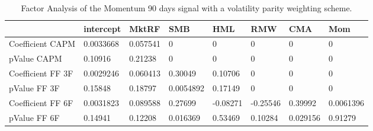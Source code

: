 \begin{table}[H]
\centering
\begin{tabular}{llllllll}
& intercept & MktRF & SMB & HML & RMW & CMA & Mom \\ 
\hline 
Coefficient CAPM & 0.0033668 & 0.057541 & 0 & 0 & 0 & 0 & 0 \\ 
pValue CAPM & 0.10916 & 0.21238 & 0 & 0 & 0 & 0 & 0 \\ 
Coefficient FF 3F & 0.0029246 & 0.060413 & 0.30049 & 0.10706 & 0 & 0 & 0 \\ 
pValue FF 3F & 0.15848 & 0.18797 & 0.0054892 & 0.17149 & 0 & 0 & 0 \\ 
Coefficient FF 6F & 0.0031823 & 0.089588 & 0.27699 & -0.08271 & -0.25546 & 0.39992 & 0.0061396 \\ 
pValue FF 6F & 0.14941 & 0.12208 & 0.016369 & 0.53469 & 0.10284 & 0.029156 & 0.91279 \\ 
\hline
\end{tabular}
\caption{Factor Analysis of the Momentum 90 days signal with a volatility parity weighting scheme.}
\label{MOM90VP_FACTOR}
\end{table}